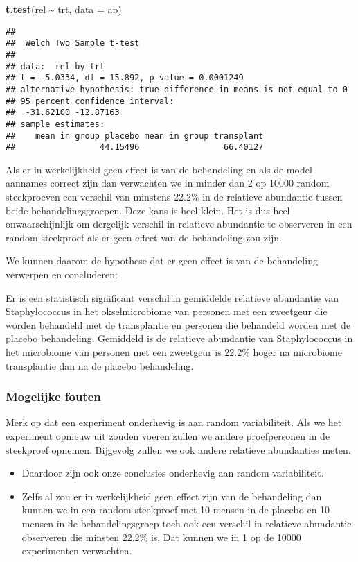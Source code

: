 \documentclass[
  12pt,dutch,coursenotes]{book}
\newenvironment{Shaded}{\begin{snugshade}}{\end{snugshade}}
\newcommand{\DataTypeTok}[1]{\textcolor[rgb]{0.13,0.29,0.53}{#1}}
\newcommand{\KeywordTok}[1]{\textcolor[rgb]{0.13,0.29,0.53}{\textbf{#1}}}
\newcommand{\NormalTok}[1]{#1}
\newcommand{\OperatorTok}[1]{\textcolor[rgb]{0.81,0.36,0.00}{\textbf{#1}}}
\newcommand{\StringTok}[1]{\textcolor[rgb]{0.31,0.60,0.02}{#1}}
\theoremstyle{definition}
\theoremstyle{definition}
\theoremstyle{definition}
\theoremstyle{remark}
\begin{document}
\begin{Shaded}
\begin{Highlighting}[]
\KeywordTok{t.test}\NormalTok{(rel }\OperatorTok{\textasciitilde{}}\StringTok{ }\NormalTok{trt, }\DataTypeTok{data =}\NormalTok{ ap)}
\end{Highlighting}
\end{Shaded}

\begin{verbatim}
## 
##  Welch Two Sample t-test
## 
## data:  rel by trt
## t = -5.0334, df = 15.892, p-value = 0.0001249
## alternative hypothesis: true difference in means is not equal to 0
## 95 percent confidence interval:
##  -31.62100 -12.87163
## sample estimates:
##    mean in group placebo mean in group transplant 
##                 44.15496                 66.40127
\end{verbatim}

Als er in werkelijkheid geen effect is van de behandeling en als de model aannames correct zijn dan verwachten we in minder dan 2 op 10000 random steekproeven een verschil van minstens 22.2\% in de relatieve abundantie tussen beide behandelingsgroepen.
Deze kans is heel klein. Het is dus heel onwaarschijnlijk om dergelijk verschil in relatieve abundantie te observeren in een random steekproef als er geen effect van de behandeling zou zijn.

We kunnen daarom de hypothese dat er geen effect is van de behandeling verwerpen en concluderen:

Er is een statistisch significant verschil in gemiddelde relatieve abundantie van Staphylococcus in het okselmicrobiome van personen met een zweetgeur die worden behandeld met de transplantie en personen die behandeld worden met de placebo behandeling.
Gemiddeld is de relatieve abundantie van Staphylococcus in het microbiome van personen met een zweetgeur is 22.2\% hoger na microbiome transplantie dan na de placebo behandeling.

\hypertarget{mogelijke-fouten}{%
\subsubsection{Mogelijke fouten}\label{mogelijke-fouten}}

Merk op dat een experiment onderhevig is aan random variabiliteit. Als we het experiment opnieuw uit zouden voeren zullen we andere proefpersonen in de steekproef opnemen. Bijgevolg zullen we ook andere relatieve abundanties meten.

\begin{itemize}
\item
  Daardoor zijn ook onze conclusies onderhevig aan random variabiliteit.
\item
  Zelfs al zou er in werkelijkheid geen effect zijn van de behandeling dan kunnen we in een random steekproef met 10 mensen in de placebo en 10 mensen in de behandelingsgroep toch ook een verschil in relatieve abundantie observeren die minsten 22.2\% is. Dat kunnen we in 1 op de 10000 experimenten verwachten.
\end{itemize}
\end{document}
